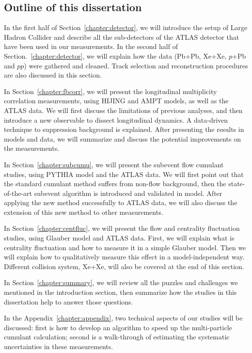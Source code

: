 \subsection{Outline of this dissertation}

In the first half of Section~\ref{chapter:detector}, we will introduce the setup of Large Hadron Collider and describe all the sub-detectors of the ATLAS detector that have been used in our measurements. In the second half of Section.~\ref{chapter:detector}, we will explain how the data (Pb+Pb, Xe+Xe, $p$+Pb and $pp$) were gathered and cleaned. Track selection and reconstruction procedures are also discussed in this section.

In Section~\ref{chapter:fbcorr}, we will present the longitudinal multiplicity correlation measurements, using HIJING and AMPT models, as well as the ATLAS data. We will first discuss the limitations of previous analyses, and then introduce a new observable to dissect longitudinal dynamics. A data-driven technique to suppression background is explained. After presenting the results in models and data, we will summarize and discuss the potential improvements on the measurements.

In Section~\ref{chapter:subcumu}, we will present the subevent flow cumulant studies, using PYTHIA model and the ATLAS data. We will first point out that the standard cumulant method suffers from non-flow background, then the state-of-the-art subevent algorithm is introduced and validated in model. After applying the new method successfully to ATLAS data, we will also discuss the extension of this new method to other measurements.

In Section~\ref{chapter:centfluc}, we will present the flow and centrality fluctuation studies, using Glauber model and ATLAS data. First, we will explain what is centrality fluctuation and how to measure it in a simple Glauber model. Then we will explain how to qualitatively measure this effect in a model-independent way. Different collision system, Xe+Xe, will also be covered at the end of this section.

In Section~\ref{chapter:summary}, we will review all the puzzles and challenges we mentioned in the introduction section, then summarize how the studies in this dissertation help to answer those questions.

In the Appendix~\ref{chapter:appendix}, two technical aspects of our studies will be discussed: first is how to develop an algorithm to speed up the multi-particle cumulant calculation; second is a walk-through of estimating the systematic uncertainties in these measurements.












